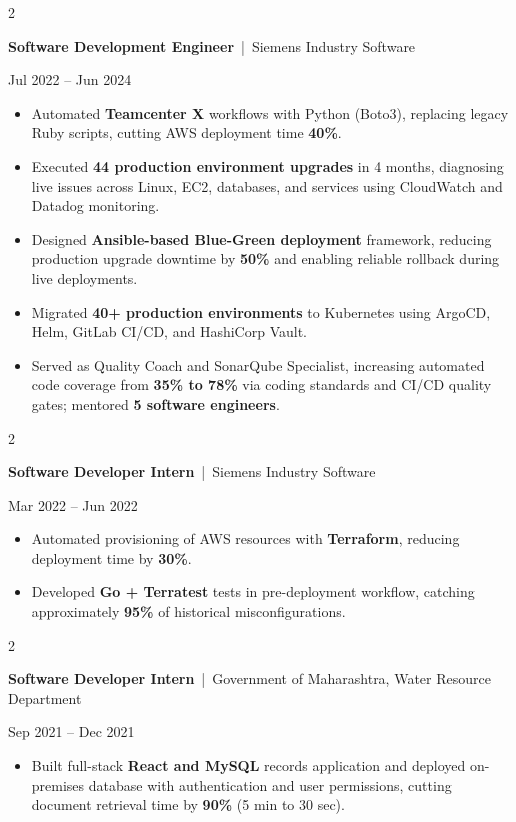 \documentclass[10pt, letterpaper]{article}
\newenvironment{highlights}{
    \begin{itemize}[
        topsep=0.10 cm,
        parsep=0.06 cm,
        partopsep=0pt,
        itemsep=0.06 cm,
        leftmargin=12pt
    ]
}{
    \end{itemize}
}
\newenvironment{twocolentry}[2][]{
    \onecolentry
    \def\secondColumn{#2}
    \setcolumnwidth{\fill, 4.5 cm}
    \begin{paracol}{2}
}{
    \switchcolumn \raggedleft \secondColumn
    \end{paracol}
    \endonecolentry
}
\begin{document}
\vspace{0.15 cm}

\begin{twocolentry}{Jul 2022 -- Jun 2024}
\textbf{Software Development Engineer} \,|\, Siemens Industry Software
\end{twocolentry}
\begin{highlights}
  \item Automated \textbf{Teamcenter X} workflows with Python (Boto3), replacing legacy Ruby scripts, cutting AWS deployment time \textbf{40\%}.
  \item Executed \textbf{44 production environment upgrades} in 4 months, diagnosing live issues across Linux, EC2, databases, and services using CloudWatch and Datadog monitoring.
  \item Designed \textbf{Ansible-based Blue-Green deployment} framework, reducing production upgrade downtime by \textbf{50\%} and enabling reliable rollback during live deployments.
  \item Migrated \textbf{40+ production environments} to Kubernetes using ArgoCD, Helm, GitLab CI/CD, and HashiCorp Vault.
  \item Served as Quality Coach and SonarQube Specialist, increasing automated code coverage from \textbf{35\% to 78\%} via coding standards and CI/CD quality gates; mentored \textbf{5 software engineers}.
\end{highlights}

\vspace{0.15 cm}

\begin{twocolentry}{Mar 2022 -- Jun 2022}
\textbf{Software Developer Intern} \,|\, Siemens Industry Software
\end{twocolentry}
\begin{highlights}
  \item Automated provisioning of AWS resources with \textbf{Terraform}, reducing deployment time by \textbf{30\%}.
  \item Developed \textbf{Go + Terratest} tests in pre-deployment workflow, catching approximately \textbf{95\%} of historical misconfigurations.
\end{highlights}

\vspace{0.15 cm}

\begin{twocolentry}{Sep 2021 -- Dec 2021}
\textbf{Software Developer Intern} \,|\, Government of Maharashtra, Water Resource Department
\end{twocolentry}
\begin{highlights}
  \item Built full-stack \textbf{React and MySQL} records application and deployed on-premises database with authentication and user permissions, cutting document retrieval time by \textbf{90\%} (5 min to 30 sec).
\end{highlights}
\end{document}
